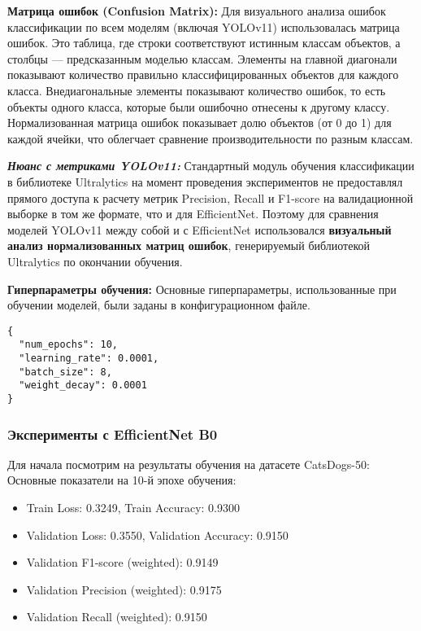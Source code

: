 \documentclass[14pt]{extarticle}
\begin{document}
\vspace{\baselineskip}

\textbf{Матрица ошибок (Confusion Matrix):} Для визуального анализа ошибок классификации по всем моделям (включая YOLOv11) использовалась матрица ошибок. Это таблица, где строки соответствуют истинным классам объектов, а столбцы --- предсказанным моделью классам. Элементы на главной диагонали показывают количество правильно классифицированных объектов для каждого класса. Внедиагональные элементы показывают количество ошибок, то есть объекты одного класса, которые были ошибочно отнесены к другому классу. Нормализованная матрица ошибок показывает долю объектов (от 0 до 1) для каждой ячейки, что облегчает сравнение производительности по разным классам.


\textbf{\textit{Нюанс с метриками YOLOv11:}} Стандартный модуль обучения классификации в библиотеке Ultralytics на момент проведения экспериментов не предоставлял прямого доступа к расчету метрик Precision, Recall и F1-score на валидационной выборке в том же формате, что и для EfficientNet. Поэтому для сравнения моделей YOLOv11 между собой и с EfficientNet использовался \textbf{визуальный анализ нормализованных матриц ошибок}, генерируемый библиотекой Ultralytics по окончании обучения.

\vspace{\baselineskip}

\textbf{Гиперпараметры обучения:} Основные гиперпараметры, использованные при обучении моделей, были заданы в конфигурационном файле.

\begin{lstlisting}[style=json, caption={Содержимое файла \texttt{hyperparams.json}}, label={lst:hyperparams}]
{
  "num_epochs": 10,
  "learning_rate": 0.0001,
  "batch_size": 8,
  "weight_decay": 0.0001
}
\end{lstlisting}

\subsubsection{Эксперименты с EfficientNet B0}
Для начала посмотрим на результаты обучения на датасете CatsDogs-50:
Основные показатели на 10-й эпохе обучения:
\begin{itemize}[leftmargin=*, itemsep=0pt]
    \item Train Loss: 0.3249, Train Accuracy: 0.9300
    \item Validation Loss: 0.3550, Validation Accuracy: 0.9150
    \item Validation F1-score (weighted): 0.9149
    \item Validation Precision (weighted): 0.9175
    \item Validation Recall (weighted): 0.9150
\end{itemize}
\end{document}
